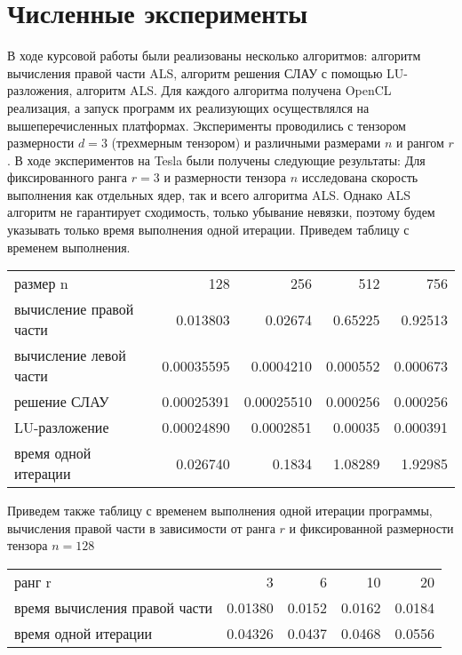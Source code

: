\documentclass{scrartcl}
\begin{document}
\section{Численные эксперименты}
\label{sec-10}

В ходе курсовой работы были реализованы несколько алгоритмов: алгоритм вычисления правой
части ALS, алгоритм решения СЛАУ с помощью LU-разложения, алгоритм ALS. Для каждого 
алгоритма получена OpenCL реализация, а запуск программ их реализующих осуществлялся
на вышеперечисленных платформах. Эксперименты проводились с тензором размерности $d=3$
(трехмерным тензором) и различными размерами $n$ и рангом $r$.
 В ходе экспериментов на Tesla были получены следующие
результаты:
Для фиксированного ранга $r=3$ и размерности тензора $n$ исследована скорость выполнения как отдельных ядер, 
так и всего алгоритма ALS. Однако ALS алгоритм не гарантирует сходимость, только
убывание невязки, поэтому будем указывать только время выполнения одной итерации.
Приведем таблицу с временем выполнения.


\begin{center}
\begin{tabular}{lrrrr}
 размер n                 &         128  &         256  &       512  &       756  \\
 вычисление правой части  &    0.013803  &     0.02674  &   0.65225  &   0.92513  \\
 вычисление левой части   &  0.00035595  &   0.0004210  &  0.000552  &  0.000673  \\
 решение СЛАУ             &  0.00025391  &  0.00025510  &  0.000256  &  0.000256  \\
 LU-разложение            &  0.00024890  &   0.0002851  &   0.00035  &  0.000391  \\
 время одной итерации     &    0.026740  &      0.1834  &   1.08289  &   1.92985  \\
\end{tabular}
\end{center}



Приведем также таблицу с временем выполнения одной итерации программы, вычисления
правой части в зависимости от ранга $r$ и фиксированной размерности тензора $n=128$

\begin{center}
\begin{tabular}{lrrrr}
 ранг r                         &        3  &       6  &      10  &      20  \\
 время вычисления правой части  &  0.01380  &  0.0152  &  0.0162  &  0.0184  \\
 время одной итерации           &  0.04326  &  0.0437  &  0.0468  &  0.0556  \\
\end{tabular}
\end{center}
\end{document}
